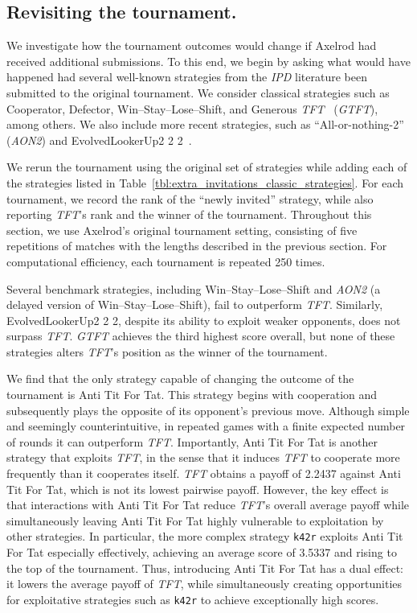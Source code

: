 \documentclass{article}
\newcommand{\TFT}{\emph{TFT}}
\newcommand{\GTFT}{\emph{GTFT}}
\newcommand{\AON}{\emph{AON2}}
\newcommand{\IPD}{\emph{IPD}}
\begin{document}
\subsection*{Revisiting the tournament.}

We investigate how the tournament outcomes would change if Axelrod had received
additional submissions. To this end, we begin by asking what would have happened
had several well-known strategies from the \IPD{} literature been submitted to
the original tournament. We consider classical strategies such as Cooperator, Defector,
Win--Stay--Lose--Shift, and Generous \TFT{}~\cite{nowak1992tit} (\GTFT), among
others. We also include more recent strategies, such as
``All-or-nothing-2''~\cite{hilbe2017memory} (\AON) and EvolvedLookerUp2 2
2~\cite{Knight2017}.

We rerun the tournament using the original set of strategies while adding each
of the strategies listed in
Table~\ref{tbl:extra_invitations_classic_strategies}. For each tournament, we
record the rank of the ``newly invited'' strategy, while also reporting
\TFT{}'s rank and the winner of the tournament. Throughout this section, we use
Axelrod's original tournament setting, consisting of five repetitions of
matches with the lengths described in the previous section. For computational
efficiency, each tournament is repeated 250 times.

Several benchmark strategies, including Win--Stay--Lose--Shift and
\AON{} (a delayed version of Win--Stay--Lose--Shift), fail to outperform
\TFT{}. Similarly, EvolvedLookerUp2 2 2, despite its ability to exploit weaker
opponents, does not surpass \TFT{}. \GTFT{} achieves the third highest score
overall, but none of these strategies alters \TFT{}'s position as the winner of
the tournament.

We find that the only strategy capable of changing the outcome of the
tournament is Anti Tit For Tat. This strategy begins with cooperation and
subsequently plays the opposite of its opponent's previous move. Although
simple and seemingly counterintuitive, in repeated games with a finite expected
number of rounds it can outperform \TFT{}. Importantly, Anti Tit For Tat is
another strategy that exploits \TFT{}, in the sense that it induces \TFT{} to
cooperate more frequently than it cooperates itself. \TFT{} obtains a payoff of
2.2437 against Anti Tit For Tat, which is not its lowest pairwise payoff.
However, the key effect is that interactions with Anti Tit For Tat reduce
\TFT{}'s overall average payoff while simultaneously leaving Anti Tit For Tat
highly vulnerable to exploitation by other strategies.
In particular, the more complex strategy \texttt{k42r} exploits Anti Tit For
Tat especially effectively, achieving an average score of 3.5337 and rising to
the top of the tournament. Thus, introducing Anti Tit For Tat has a dual
effect: it lowers the average payoff of \TFT{}, while simultaneously creating
opportunities for exploitative strategies such as \texttt{k42r} to achieve
exceptionally high scores.
\end{document}
